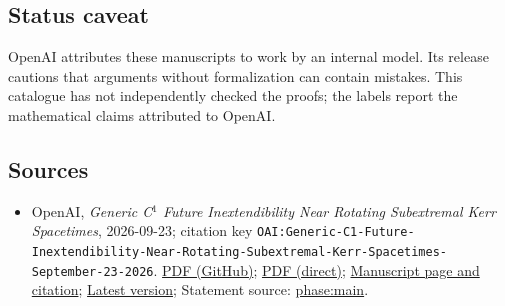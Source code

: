 \documentclass[11pt]{article}
\begin{document}
\subsection{Status caveat}
OpenAI attributes these manuscripts to work by an internal model. Its release cautions that arguments without formalization can contain mistakes. This catalogue has not independently checked the proofs; the labels report the mathematical claims attributed to OpenAI.

\subsection{Sources}
\begin{itemize}
\item OpenAI, \emph{Generic C\({}^{1}\) Future Inextendibility Near Rotating Subextremal Kerr Spacetimes}, 2026-09-23; citation key \texttt{OAI:Generic-C1-Future-Inextendibility-Near-Rotating-Subextremal-Kerr-Spacetimes-September-23-2026}. \href{https://github.com/openai/math/blob/adc7f1241b42e322a6451854ab7e4b4c146bf78a/preprints/Generic-C1-Future-Inextendibility-Near-Rotating-Subextremal-Kerr-Spacetimes-September-23-2026/paper.pdf}{PDF (GitHub)}; \href{https://github.com/openai/math/raw/adc7f1241b42e322a6451854ab7e4b4c146bf78a/preprints/Generic-C1-Future-Inextendibility-Near-Rotating-Subextremal-Kerr-Spacetimes-September-23-2026/paper.pdf}{PDF (direct)}; \href{https://github.com/openai/math/blob/adc7f1241b42e322a6451854ab7e4b4c146bf78a/preprints/Generic-C1-Future-Inextendibility-Near-Rotating-Subextremal-Kerr-Spacetimes-September-23-2026/README.md}{Manuscript page and citation}; \href{https://github.com/openai/math/blob/main/preprints/Generic-C1-Future-Inextendibility-Near-Rotating-Subextremal-Kerr-Spacetimes-September-23-2026/paper.pdf}{Latest version}; Statement source: \href{https://github.com/openai/math/blob/adc7f1241b42e322a6451854ab7e4b4c146bf78a/preprints/Generic-C1-Future-Inextendibility-Near-Rotating-Subextremal-Kerr-Spacetimes-September-23-2026/build/sections/02-phase-space.tex\#L94}{phase:main}.

\end{itemize}
\end{document}
